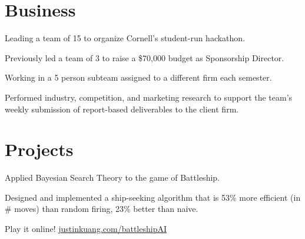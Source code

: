 \documentclass[]{deedy-resume-openfont}
\begin{document}
\begin{minipage}[t]{0.66\textwidth}

\section{Business}

\begin{tightemize}
\item Leading a team of 15 to organize Cornell's student-run hackathon.
\item Previously led a team of 3 to raise a \$70,000 budget as Sponsorship Director.
\end{tightemize}
\sectionsep

\begin{tightemize}
\item Working in a 5 person subteam assigned to a different firm each semester.
\item Performed industry, competition, and marketing research to support the team's weekly submission of report-based deliverables to the client firm.
\end{tightemize}
\sectionsep


\section{Projects}

\begin{tightemize}
\item Applied Bayesian Search Theory to the game of Battleship. 
\item Designed and implemented a ship-seeking algorithm that is 53\% more efficient (in \# moves) than random firing, 23\% better than naive.
\item Play it online! \href{https://justinkuang.com/battleshipAI}{\underline{justinkuang.com/battleshipAI}}

\end{tightemize}
\sectionsep





\end{minipage}
\end{document}
